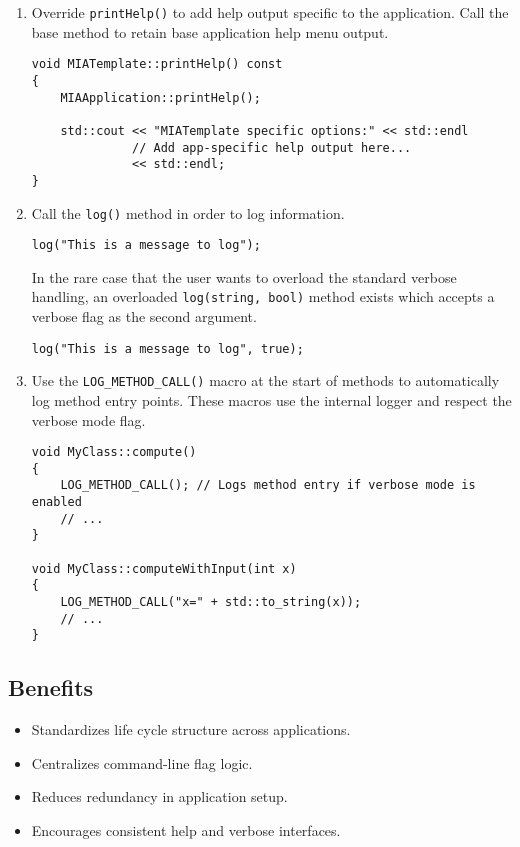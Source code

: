 \begin{enumerate}
	\item Override \texttt{printHelp()} to add help output specific to the application. Call the base method to retain base application help menu output.
	\begin{lstlisting}[style=cppstyle]
void MIATemplate::printHelp() const
{
    MIAApplication::printHelp();
    
    std::cout << "MIATemplate specific options:" << std::endl
              // Add app-specific help output here...
              << std::endl;
}
	\end{lstlisting}
 
	\item Call the \texttt{log()} method in order to log information.
	\begin{lstlisting}[style=cppstyle]
log("This is a message to log");
	\end{lstlisting}
	In the rare case that the user wants to overload the standard verbose handling, an overloaded \texttt{log(string, bool)} method exists which accepts a verbose flag as the second argument.
	\begin{lstlisting}[style=cppstyle]
log("This is a message to log", true);
	\end{lstlisting}
 
	 \item Use the \texttt{LOG\_METHOD\_CALL()} macro at the start of methods to automatically log method entry points. These macros use the internal logger and respect the verbose mode flag.
	\begin{lstlisting}[style=cppstyle]
void MyClass::compute()
{
    LOG_METHOD_CALL(); // Logs method entry if verbose mode is enabled
    // ...
}

void MyClass::computeWithInput(int x)
{
    LOG_METHOD_CALL("x=" + std::to_string(x));
    // ...
}
	\end{lstlisting}
\end{enumerate}

\subsection*{Benefits}
\begin{itemize}\itemsep0em
	\item Standardizes life cycle structure across applications.
	\item Centralizes command-line flag logic.
	\item Reduces redundancy in application setup.
	\item Encourages consistent help and verbose interfaces.
\end{itemize}











